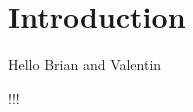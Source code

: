 \documentclass[11pt]{article}
\begin{document}
	\section{Introduction}
	Hello Brian and Valentin

	!!!
	
	
	
	
	
\end{document}
